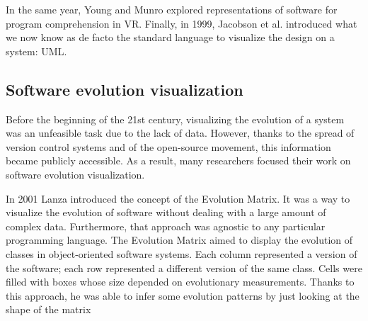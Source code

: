 In the same year, Young and Munro \cite{Young1998} explored representations of software for program comprehension in VR. 
Finally, in 1999, Jacobson et al. \cite{Jacobson1999} introduced what we now know as de facto the standard language to visualize the design on a system: UML. 



\subsection{Software evolution visualization}
Before the beginning of the 21st century, visualizing the evolution of a system was an unfeasible task due to the lack of data. 
However, thanks to the spread of version control systems and of the open-source movement, this information became publicly accessible.
As a result, many researchers focused their work on software evolution visualization.

In 2001 Lanza \cite{Lanza2001} introduced the concept of the Evolution Matrix. It was a way to visualize the evolution of software without dealing with a large amount of complex data. 
Furthermore, that approach was agnostic to any particular programming language. The Evolution Matrix aimed to display the evolution of classes in object-oriented software systems. 
Each column represented a version of the software; each row represented a different version of the same class. Cells were filled with boxes whose size depended on evolutionary measurements. 
Thanks to this approach, he was able to infer some evolution patterns by just looking at the shape of the matrix



